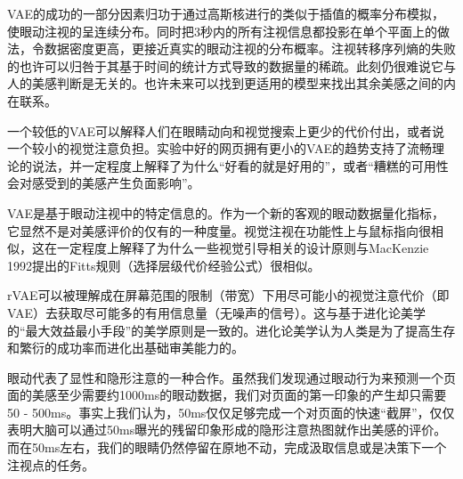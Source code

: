 VAE的成功的一部分因素归功于通过高斯核进行的类似于插值的概率分布模拟，使眼动注视的呈连续分布。同时把3秒内的所有注视信息都投影在单个平面上的做法，令数据密度更高，更接近真实的眼动注视的分布概率。注视转移序列熵的失败的也许可以归咎于其基于时间的统计方式导致的数据量的稀疏。此刻仍很难说它与人的美感判断是无关的。也许未来可以找到更适用的模型来找出其余美感之间的内在联系。

一个较低的VAE可以解释人们在眼睛动向和视觉搜索上更少的代价付出，或者说一个较小的视觉注意负担。实验中好的网页拥有更小的VAE的趋势支持了流畅理论的说法，并一定程度上解释了为什么“好看的就是好用的”，或者“糟糕的可用性会对感受到的美感产生负面影响”。

VAE是基于眼动注视中的特定信息的。作为一个新的客观的眼动数据量化指标，它显然不是对美感评价的仅有的一种度量。视觉注视在功能性上与鼠标指向很相似，这在一定程度上解释了为什么一些视觉引导相关的设计原则与MacKenzie 1992提出的Fitts规则（选择层级代价经验公式）很相似。

rVAE可以被理解成在屏幕范围的限制（带宽）下用尽可能小的视觉注意代价（即VAE）去获取尽可能多的有用信息量（无噪声的信号）。这与基于进化论美学的“最大效益最小手段”的美学原则是一致的。进化论美学认为人类是为了提高生存和繁衍的成功率而进化出基础审美能力的。

眼动代表了显性和隐形注意的一种合作。虽然我们发现通过眼动行为来预测一个页面的美感至少需要约1000ms的眼动数据，我们对页面的第一印象的产生却只需要50 - 500ms。事实上我们认为，50ms仅仅足够完成一个对页面的快速“截屏”，仅仅表明大脑可以通过50ms曝光的残留印象形成的隐形注意热图就作出美感的评价。而在50ms左右，我们的眼睛仍然停留在原地不动，完成汲取信息或是决策下一个注视点的任务。

